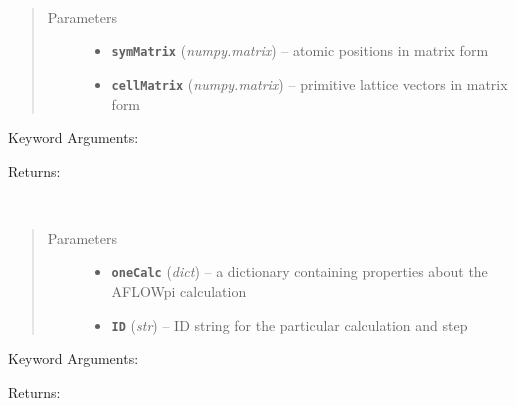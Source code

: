 \documentclass[letterpaper,10pt,english]{sphinxmanual}
\begin{document}

\begin{fulllineitems}
\label{retr:retr.shiftZ}~\begin{quote}\begin{description}
\item[{Parameters}] \leavevmode\begin{itemize}
\item {} 
\textbf{\texttt{symMatrix}} (\emph{numpy.matrix}) -- atomic positions in matrix form

\item {} 
\textbf{\texttt{cellMatrix}} (\emph{numpy.matrix}) -- primitive lattice vectors in matrix form

\end{itemize}

\end{description}\end{quote}

Keyword Arguments:

Returns:

\end{fulllineitems}


\begin{fulllineitems}
\label{retr:retr.transform_input_conv}~\begin{quote}\begin{description}
\item[{Parameters}] \leavevmode\begin{itemize}
\item {} 
\textbf{\texttt{oneCalc}} (\emph{dict}) -- a dictionary containing properties about the AFLOWpi calculation

\item {} 
\textbf{\texttt{ID}} (\emph{str}) -- ID string for the particular calculation and step

\end{itemize}

\end{description}\end{quote}

Keyword Arguments:

Returns:

\end{fulllineitems}
\end{document}
